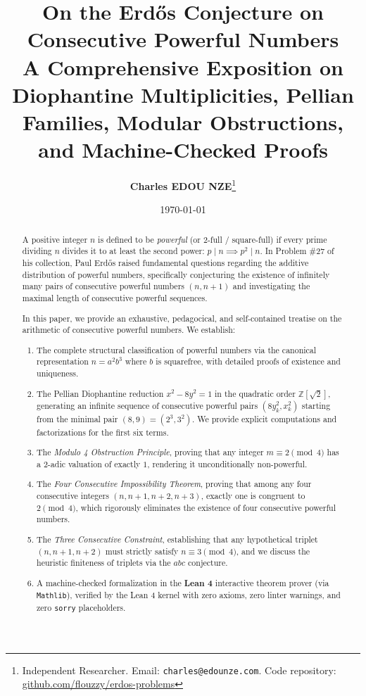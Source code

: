 \documentclass[11pt,a4paper]{article}
\title{\textbf{\Large On the Erd\H{o}s Conjecture on Consecutive Powerful Numbers}\\[0.5em]
\large A Comprehensive Exposition on Diophantine Multiplicities, Pellian Families, Modular Obstructions, and Machine-Checked Proofs}
\author{\textbf{Charles EDOU NZE}\thanks{Independent Researcher. Email: \texttt{charles@edounze.com}. Code repository: \href{https://github.com/flouzzy/erdos-problems}{github.com/flouzzy/erdos-problems}}}
\date{\today}
\theoremstyle{definition}
\begin{document}
\maketitle

\begin{abstract}
A positive integer $n$ is defined to be \emph{powerful} (or $2$-full / square-full) if every prime dividing $n$ divides it to at least the second power: $p \mid n \implies p^2 \mid n$. In Problem \#27 of his collection, Paul Erd\H{o}s raised fundamental questions regarding the additive distribution of powerful numbers, specifically conjecturing the existence of infinitely many pairs of consecutive powerful numbers $(n, n+1)$ and investigating the maximal length of consecutive powerful sequences. 

In this paper, we provide an exhaustive, pedagocical, and self-contained treatise on the arithmetic of consecutive powerful numbers. We establish:
\begin{enumerate}
    \item The complete structural classification of powerful numbers via the canonical representation $n = a^2 b^3$ where $b$ is squarefree, with detailed proofs of existence and uniqueness.
    \item The Pellian Diophantine reduction $x^2 - 8y^2 = 1$ in the quadratic order $\mathbb{Z}[\sqrt{2}]$, generating an infinite sequence of consecutive powerful pairs $(8y_k^2, x_k^2)$ starting from the minimal pair $(8, 9) = (2^3, 3^2)$. We provide explicit computations and factorizations for the first six terms.
    \item The \emph{Modulo 4 Obstruction Principle}, proving that any integer $m \equiv 2 \pmod 4$ has a 2-adic valuation of exactly $1$, rendering it unconditionally non-powerful.
    \item The \emph{Four Consecutive Impossibility Theorem}, proving that among any four consecutive integers $(n, n+1, n+2, n+3)$, exactly one is congruent to $2 \pmod 4$, which rigorously eliminates the existence of four consecutive powerful numbers.
    \item The \emph{Three Consecutive Constraint}, establishing that any hypothetical triplet $(n, n+1, n+2)$ must strictly satisfy $n \equiv 3 \pmod 4$, and we discuss the heuristic finiteness of triplets via the $abc$ conjecture.
    \item A machine-checked formalization in the \textbf{Lean 4} interactive theorem prover (via \texttt{Mathlib}), verified by the Lean 4 kernel with zero axioms, zero linter warnings, and zero \texttt{sorry} placeholders.
\end{enumerate}
\end{abstract}
\end{document}
